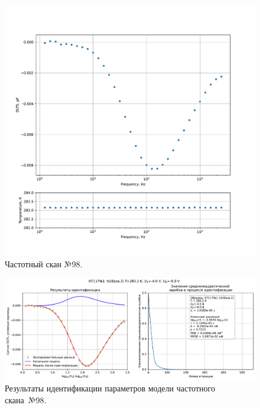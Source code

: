 \begin{figure}[!ht]
    \centering
    \includegraphics[width=1\textwidth]{../plots/КТ117№1_п1(база 2)_2500Гц-1Гц_1пФ_+10С_-4В-9В_200мВ_20мкс_шаг_0,1.pdf}
    \caption{Частотный скан №98.}
    \label{pic:frequency_scan_98}
\end{figure}

\begin{figure}[!ht]
    \centering
    \includegraphics[width=1\textwidth]{../plots/КТ117№1_п1(база 2)_2500Гц-1Гц_1пФ_+10С_-4В-9В_200мВ_20мкс_шаг_0,1_model.pdf}
    \caption{Результаты идентификации параметров модели частотного скана~№98.}
    \label{pic:frequency_scan_model98}
\end{figure}

\pagebreak


